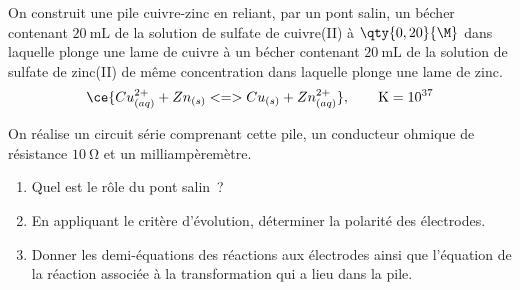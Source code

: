On construit une pile cuivre-zinc en reliant, par un pont salin, un bécher
contenant $\qty{20}{\mL}$ de la solution de sulfate de cuivre(II) à
$\qty{0,20}{\M}$ dans laquelle plonge une lame de cuivre à un bécher contenant
$\qty{20}{\mL}$ de la solution de sulfate de zinc(II) de même concentration dans
laquelle plonge une lame de zinc.
\[
    \ce{Cu^{2+}_{(aq)} + Zn_{(s)} <=> Cu_{(s)} + Zn^{2+}_{(aq)}},
    \qquad \mathrm{K}=10^{37}
\]

On réalise un circuit série comprenant cette pile, un conducteur ohmique de
résistance $\qty{10}{\ohm}$ et un milliampèremètre.
\begin{enumerate}
    \item Quel est le rôle du pont salin~?
    \item En appliquant le critère d'évolution, déterminer la polarité des
          électrodes.
    \item Donner les demi-équations des réactions aux électrodes ainsi que
          l'équation de la réaction associée à la transformation qui a lieu dans
          la pile.
\end{enumerate}

